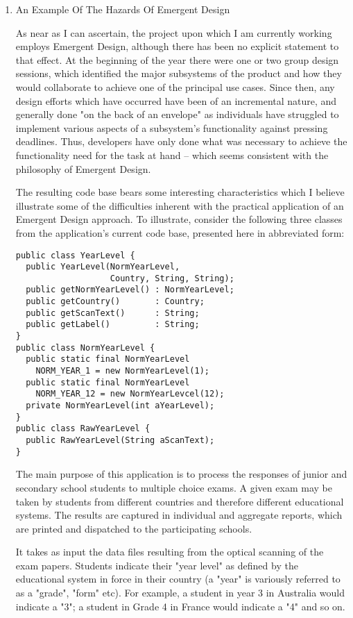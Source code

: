 \documentclass{article}
\begin{document}
\begin{enumerate}
\item An Example Of The Hazards Of Emergent Design
\label{sec:orgheadline232}

As near as I can ascertain, the project upon which I am currently
working employs Emergent Design, although there has been no explicit
statement to that effect. At the beginning of the year there were one or
two group design sessions, which identified the major subsystems of the
product and how they would collaborate to achieve one of the principal
use cases. Since then, any design efforts which have occurred have been
of an incremental nature, and generally done "on the back of an
envelope" as individuals have struggled to implement various aspects of
a subsystem's functionality against pressing deadlines. Thus, developers
have only done what was necessary to achieve the functionality need for
the task at hand -- which seems consistent with the philosophy of
Emergent Design.

The resulting code base bears some interesting characteristics which I
believe illustrate some of the difficulties inherent with the practical
application of an Emergent Design approach. To illustrate, consider the
following three classes from the application's current code base,
presented here in abbreviated form:

\begin{verbatim}
public class YearLevel {
  public YearLevel(NormYearLevel,
                   Country, String, String);
  public getNormYearLevel() : NormYearLevel;
  public getCountry()       : Country;
  public getScanText()      : String;
  public getLabel()         : String;
}
public class NormYearLevel {
  public static final NormYearLevel
    NORM_YEAR_1 = new NormYearLevel(1);
  public static final NormYearLevel
    NORM_YEAR_12 = new NormYearLevcel(12);
  private NormYearLevel(int aYearLevel);
}
public class RawYearLevel {
  public RawYearLevel(String aScanText);
}
\end{verbatim}

The main purpose of this application is to process the responses of
junior and secondary school students to multiple choice exams. A given
exam may be taken by students from different countries and therefore
different educational systems. The results are captured in individual
and aggregate reports, which are printed and dispatched to the
participating schools.

It takes as input the data files resulting from the optical scanning of
the exam papers. Students indicate their "year level" as defined by the
educational system in force in their country (a "year" is variously
referred to as a "grade", "form" etc). For example, a student in year 3
in Australia would indicate a "3"; a student in Grade 4 in France would
indicate a "4" and so on.


\end{enumerate}
\end{document}
